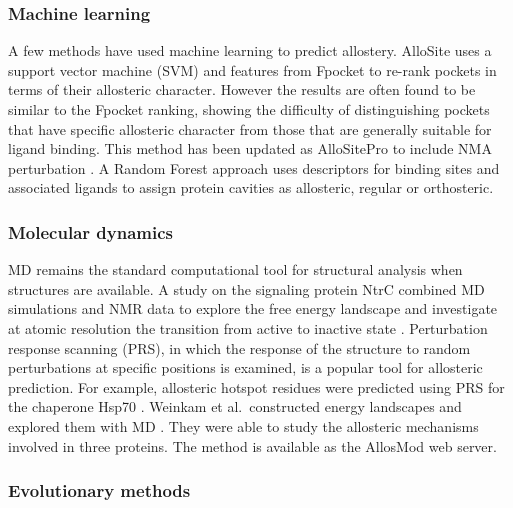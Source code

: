 \subsubsection{Machine learning}

A few methods have used machine learning to predict allostery.
AlloSite \cite{Huang2013} uses a support vector machine (SVM) and features from Fpocket \cite{LeGuilloux2009} to re-rank pockets in terms of their allosteric character.
However the results are often found to be similar to the Fpocket ranking, showing the difficulty of distinguishing pockets that have specific allosteric character from those that are generally suitable for ligand binding.
This method has been updated as AlloSitePro to include NMA perturbation \cite{Song2017}.
A Random Forest approach \cite{Chen2016} uses descriptors for binding sites and associated ligands to assign protein cavities as allosteric, regular or orthosteric.


\subsubsection{Molecular dynamics}

MD remains the standard computational tool for structural analysis when structures are available.
A study on the signaling protein NtrC combined MD simulations and NMR data to explore the free energy landscape and investigate at atomic resolution the transition from active to inactive state \cite{Pontiggia2015}.
Perturbation response scanning (PRS), in which the response of the structure to random perturbations at specific positions is examined, is a popular tool for allosteric prediction.
For example, allosteric hotspot residues were predicted using PRS for the chaperone Hsp70 \cite{Penkler2017}.
Weinkam et al.\ constructed energy landscapes and explored them with MD \cite{Weinkam2012}.
They were able to study the allosteric mechanisms involved in three proteins.
The method is available as the AllosMod web server.


\subsubsection{Evolutionary methods}

